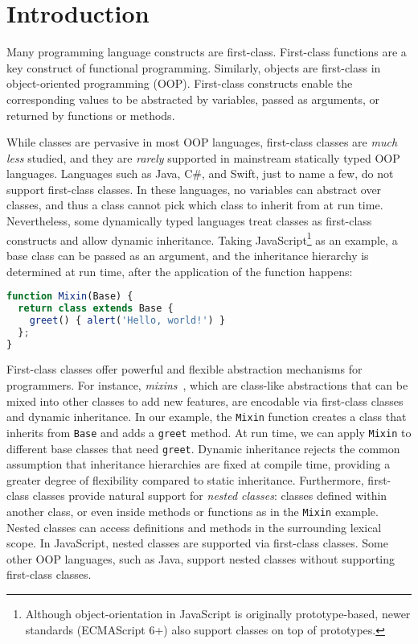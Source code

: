 \section{Introduction}

Many programming language constructs are first-class. First-class functions are
a key construct of functional programming. Similarly, objects are first-class in
object-oriented programming (OOP). First-class constructs enable the
corresponding values to be abstracted by variables, passed as arguments, or
returned by functions or methods.

While classes are pervasive in most OOP languages, first-class classes are
\emph{much less} studied, and they are \emph{rarely} supported in mainstream
statically typed OOP languages. Languages such as Java, C\#, and Swift, just to
name a few, do not support first-class classes. In these languages, no variables
can abstract over classes, and thus a class cannot pick which class to inherit
from at run time. Nevertheless, some dynamically typed languages treat classes
as first-class constructs and allow dynamic inheritance. Taking
JavaScript\footnote{Although object-orientation in JavaScript is originally
prototype-based, newer standards (ECMAScript 6+) also support classes on top of
prototypes.} as an example, a base class can be passed as an argument, and the
inheritance hierarchy is determined at run time, after the application of the
function happens:
\begin{lstlisting}[language=TypeScript]
function Mixin(Base) {
  return class extends Base {
    greet() { alert('Hello, world!') }
  };
}
\end{lstlisting}
First-class classes offer powerful and flexible abstraction mechanisms for
programmers. For instance, \emph{mixins}~\citep{bracha1990mixin}, which are
class-like abstractions that can be mixed into other classes to add new
features, are encodable via first-class classes and dynamic inheritance. In our
example, the \lstinline{Mixin} function creates a class that inherits from
\lstinline{Base} and adds a \lstinline{greet} method. At run time, we can apply
\lstinline{Mixin} to different base classes that need \lstinline{greet}. Dynamic
inheritance rejects the common assumption that inheritance hierarchies are fixed
at compile time, providing a greater degree of flexibility compared to static
inheritance. Furthermore, first-class classes provide natural support for
\emph{nested classes}: classes defined within another class, or even inside
methods or functions as in the \lstinline{Mixin} example. Nested classes can
access definitions and methods in the surrounding lexical scope. In JavaScript,
nested classes are supported via first-class classes. Some other OOP languages,
such as Java, support nested classes without supporting first-class classes.

